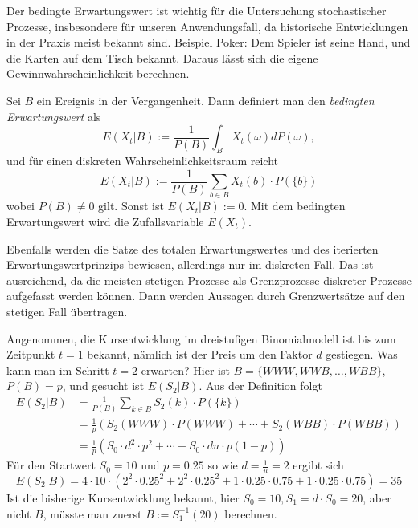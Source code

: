 \begin{defi}

Der bedingte Erwartungswert ist wichtig für die Untersuchung stochastischer Prozesse,
insbesondere für unseren Anwendungsfall, da historische Entwicklungen in der Praxis 
meist bekannt sind. Beispiel Poker: Dem Spieler ist seine Hand, und die Karten auf dem 
Tisch bekannt. Daraus lässt sich die eigene Gewinnwahrscheinlichkeit berechnen.

Sei $B$ ein Ereignis in der Vergangenheit. Dann definiert man
den \textit{bedingten Erwartungswert} als $$E(X_t|B):=  \frac{1}{P(B)} \int_{B}^{} X_t(\omega) dP(\omega),$$
und für einen diskreten Wahrscheinlichkeitsraum reicht
$$E(X_t|B):= \frac{1}{P(B)}\sum_{b \in B} X_t(b) \cdot P(\{ b \})$$
wobei $P(B) \neq 0$ gilt. Sonst ist $E(X_t|B) :=0$. 
Mit dem bedingten Erwartungswert wird die Zufallsvariable $E(X_t)$.

Ebenfalls werden die Satze des totalen Erwartungswertes und des iterierten Erwartungswertprinzips bewiesen,
allerdings nur im diskreten Fall. Das ist ausreichend, da die meisten stetigen 
Prozesse als Grenzprozesse diskreter Prozesse aufgefasst werden können.
Dann werden Aussagen durch Grenzwertsätze auf den stetigen Fall übertragen. 

\end{defi}

\begin{bsp}[Rechenbeispiel]
Angenommen, die Kursentwicklung im dreistufigen Binomialmodell ist bis zum 
Zeitpunkt $t=1$ bekannt, nämlich ist der Preis um den Faktor $d$ gestiegen. 
Was kann man im Schritt $t=2$ erwarten? Hier ist $B=\{WWW, WWB, \dots, WBB \}$, $P(B)=p$, und gesucht ist $E(S_2|B)$. Aus der Definition folgt
$$
\begin{aligned}
E(S_2|B) &= \frac{1}{P(B)}\sum_{k \in B} S_2(k) \cdot P(\{ k \}) \\ &=\frac{1}{p}(S_2(WWW) \cdot P(WWW)+ \cdots + S_2(WBB) \cdot P(WBB)) \\
&= \frac{1}{p} (S_0 \cdot d^2 \cdot  p^2 + \cdots + S_0 \cdot d u \cdot p (1-p))
\end{aligned}
$$
Für den Startwert $S_0=10$ und $p=0.25$ so wie $d=\frac{1}{u}=2$ ergibt sich
$$E(S_2|B)=4 \cdot 10 \cdot \left( 2^2 \cdot 0.25^2 + 2^2 \cdot 0.25^2 + 1 \cdot 0.25\cdot 0.75 + 1 \cdot 0.25\cdot 0.75 \right)=35$$
Ist die bisherige Kursentwicklung bekannt, hier $S_0=10, S_1 = d \cdot S_0=20$, aber nicht $B$, müsste man zuerst $B:=S_1^{-1}(20)$ berechnen.
\end{bsp}

